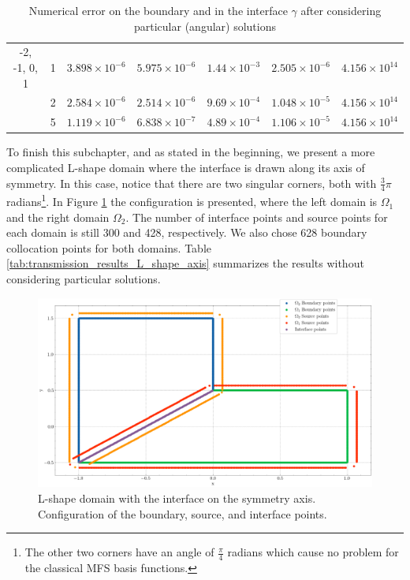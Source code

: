\begin{table}[!htbp]
\begin{longtable}{ccccccc}
        -2, -1, 0, 1 & 1 & $3.898\times10^{-6}$ & $5.975\times10^{-6}$ & $1.44\times10^{-3}$ & $2.505\times10^{-6}$ & $4.156\times10^{14}$ \\
        & 2 & $2.584\times10^{-6}$ & $2.514\times10^{-6}$ & $9.69\times10^{-4}$ & $1.048\times10^{-5}$ & $4.156\times10^{14}$ \\
        & 5 & $1.119\times10^{-6}$ & $6.838\times10^{-7}$ & $4.89\times10^{-4}$ & $1.106\times10^{-5}$ & $4.156\times10^{14}$ \\
        \midrule[\heavyrulewidth] %
    \end{longtable}
    \caption{Numerical error on the boundary and in the interface \(\gamma\) after considering particular (angular) solutions}
    \label{tab:transmission_results_L_shape_rectangles_particular}
\end{table}

To finish this subchapter, and as stated in the beginning, we present a more complicated L-shape domain where the interface is drawn along its axis of symmetry. In this case, notice that there are two singular corners, both with \(\frac{3}{4}\pi\) radians\footnote{The other two corners have an angle of \(\frac{\pi}{4}\) radians which cause no problem for the classical \ac{MFS} basis functions.}. In Figure \ref{transmission_L_shape_col_axis_config} the configuration is presented, where the left domain is \(\Omega_1\) and the right domain \(\Omega_2\). The number of interface points and source points for each domain is still 300 and 428, respectively. We also chose 628 boundary collocation points for both domains. Table \ref{tab:transmission_results_L_shape_axis} summarizes the results without considering particular solutions.

\begin{figure}[!htb]
    \centering
    \includegraphics[height=0.4\linewidth,width=0.53\linewidth]{Images/Transmission/L_shape_2_axis_col_points.png}
    \caption{L-shape domain with the interface on the symmetry axis. Configuration of the boundary, source, and interface points.}
    \label{transmission_L_shape_col_axis_config}
\end{figure}

